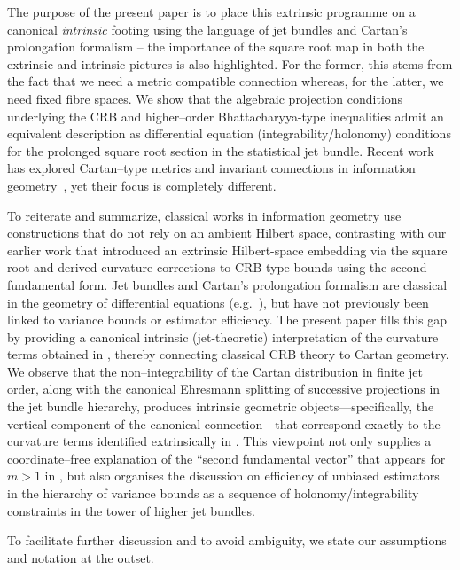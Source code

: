 \documentclass[3p,times]{elsarticle}
\begin{document}
The purpose of the present paper is to place this extrinsic programme on a
canonical {\em intrinsic} footing using the language of jet bundles and Cartan's
prolongation formalism -- the importance of the square root map in both the extrinsic and intrinsic pictures is also highlighted. For the former, this stems from the fact that we need a metric compatible connection whereas, for the latter, we need fixed fibre spaces. We show that the algebraic projection conditions underlying the CRB and higher--order Bhattacharyya-type inequalities
admit an equivalent description as differential equation (integrability/holonomy) conditions for the prolonged square root section in the statistical jet bundle. Recent work has explored Cartan–type metrics and invariant connections in information geometry~\cite{diatta}, yet their focus is completely different.

To reiterate and summarize, classical works in information geometry use constructions that do not rely on an ambient Hilbert space, contrasting with our earlier work \cite{SRK,srkvector} that introduced an extrinsic Hilbert-space embedding via the square root and derived curvature corrections to CRB-type bounds using the second fundamental form.  
Jet bundles and Cartan's prolongation formalism are classical in the geometry of
differential equations (e.g.\ \cite{Saunders}), but have not previously been
linked to variance bounds or estimator efficiency.  
The present paper fills this gap by providing a canonical intrinsic
(jet-theoretic) interpretation of the curvature terms obtained in
\cite{SRK}, thereby connecting classical CRB theory to Cartan geometry. We observe that the non--integrability of the Cartan distribution in finite jet order, along
with the canonical Ehresmann splitting of successive projections
in the jet bundle hierarchy, produces intrinsic geometric objects---specifically,
the vertical component of the canonical connection---that correspond exactly to
the curvature terms identified extrinsically in \cite{SRK}.  
This viewpoint not only supplies a coordinate--free explanation of the 
``second fundamental vector'' that appears for $m>1$ in \cite{SRK}, but also
organises the discussion on efficiency of unbiased estimators in the hierarchy of variance bounds as a sequence of holonomy/integrability constraints in the tower of higher jet bundles.

To facilitate further discussion and to avoid ambiguity, we state our assumptions and notation at the outset. 
\medskip
\end{document}
